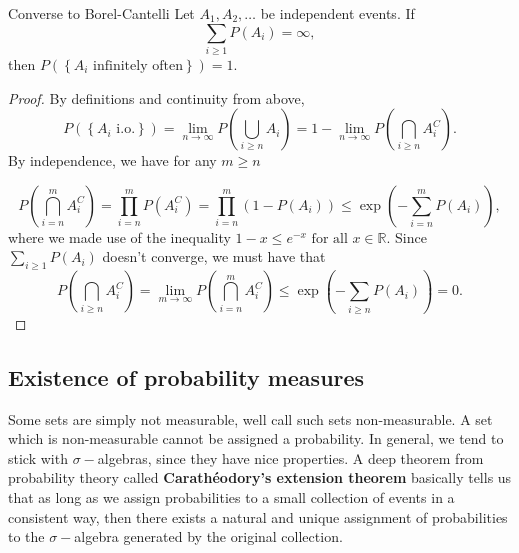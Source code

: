 \begin{lem}{Converse to Borel-Cantelli}{}
Let \( A_1, A_2, \dots  \) be independent events. If 
\[
    \sum _{i\geq 1} P(A_{i} )= \infty , 
\]
then \( P (\left\{ A_{i} \text{ infinitely often}  \right\} ) = 1.\) 

\tcbline

\begin{proof}
By definitions and continuity from above, 
\[
    P\left(   \left\{ A_{i} \text{ i.o.}  \right\} \right) = \lim_{n \to \infty} P\left(   \bigcup_{i\geq n}A_{i}  \right) = 1 - \lim_{n \to \infty} P\left(  \bigcap_{i\geq n} A_{i} ^{C}   \right).
\]
By independence, we have for any \( m\geq n \) 

\[
    P\left( \bigcap_{i = n}^{m} A_{i} ^{C}  \right) = \prod_{i = n}^{m} P(A_{i} ^{C} ) = \prod_{i= n}^{m}(1 - P(A_{i} )) \leq \exp \left( - \sum_{i = n}^{m} P(A_{i} )  \right), 
\]
where we made use of the inequality \( 1 - x\leq e^{-x}  \text{ for all }   x \in \mathbb{R}   \). Since \( \sum_{i\geq 1}P(A_{i} )  \)  doesn't converge, we must have that 
\[
    P\left( \bigcap_{i\geq n} A_{i} ^{C}   \right) = \lim_{m \to \infty} P \left( \bigcap_{i = n}^{m}  A_{i}  ^{C} \right) \leq \exp \left(- \sum_{i\geq n}P(A_{i} )  \right) = 0.  
\]
\end{proof}

\end{lem}


\subsection{Existence of probability measures}

Some sets are simply not measurable, well call such sets non-measurable. A set which is non-measurable cannot be assigned a probability. In general, we tend to stick with \( \sigma - \)algebras, since they have nice properties. A deep theorem from probability theory called \textbf{Carathéodory's extension theorem} basically tells us that as long as we assign probabilities to a small collection of events in a consistent way, then there exists a natural and unique assignment of probabilities to the \( \sigma - \)algebra generated by the original collection. 


